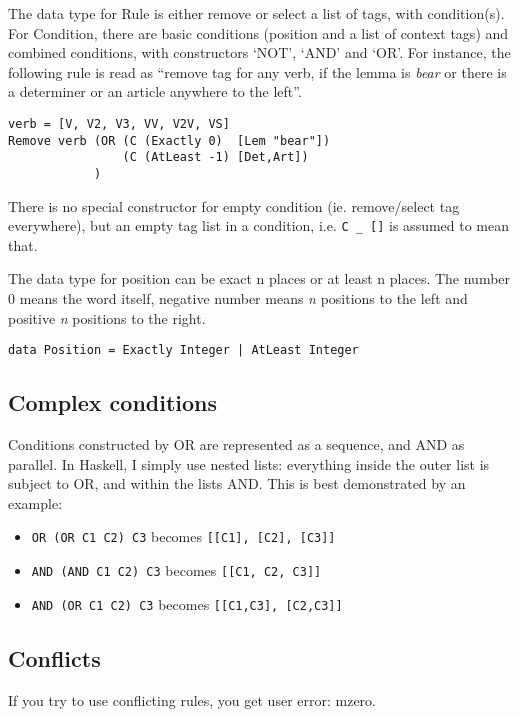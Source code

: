 \documentclass[a4paper, 11pt]{article}
\begin{document}
The data type for Rule is either remove or select a list of tags, with condition(s).
For Condition, there are basic conditions (position and a list of context tags) and combined conditions, with constructors `NOT', `AND' and `OR'. For instance, the following rule is read as ``remove tag for any verb, if the lemma is \emph{bear} or there is a determiner or an article anywhere to the left''.

\begin{lstlisting}
verb = [V, V2, V3, VV, V2V, VS]
Remove verb (OR (C (Exactly 0)  [Lem "bear"])
                (C (AtLeast -1) [Det,Art])
            )
\end{lstlisting}

There is no special constructor for empty condition (ie. remove/select tag everywhere), but an empty tag list in a condition, i.e. \texttt{C \_ []} is assumed to mean that.

The data type for position can be exact n places or at least n places. The number 0 means the word itself, negative number means \emph{n} positions to the left and positive \emph{n} positions to the right.

\begin{lstlisting}
data Position = Exactly Integer | AtLeast Integer
 \end{lstlisting}

\subsection{Complex conditions}
Conditions constructed by OR are represented as a sequence, and AND as
parallel. In Haskell, I simply use nested lists: everything inside the
outer list is subject to OR, and within the lists AND. This is best
demonstrated by an example:

\begin{itemize}
\item \texttt{OR (OR C1 C2) C3} becomes \texttt{[[C1], [C2], [C3]]} 
\item \texttt{AND (AND C1 C2) C3} becomes \texttt{[[C1, C2, C3]]} 
\item \texttt{AND (OR C1 C2) C3} becomes \texttt{[[C1,C3], [C2,C3]]}
\end{itemize}

\subsection{Conflicts}
If you try to use conflicting rules, you get user error: mzero.
\end{document}
